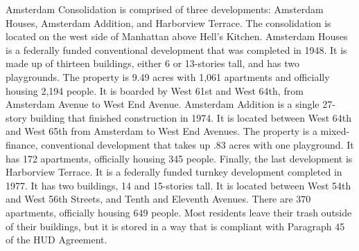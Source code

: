  

 

Amsterdam Consolidation is comprised of three developments: Amsterdam Houses, Amsterdam Addition, and Harborview Terrace. The consolidation is located on the west side of Manhattan above Hell's Kitchen. Amsterdam Houses is a federally funded conventional development that was completed in 1948. It is made up of thirteen buildings, either 6 or 13-stories tall, and has two playgrounds. The property is 9.49 acres with 1,061 apartments and officially housing 2,194 people. It is boarded by West 61st and West 64th, from Amsterdam Avenue to West End Avenue. Amsterdam Addition is a single 27-story building that finished construction in 1974. It is located between West 64th and West 65th from Amsterdam to West End Avenues. The property is a mixed-finance, conventional development that takes up .83 acres with one playground. It has 172 apartments, officially housing 345 people. Finally, the last development is Harborview Terrace. It is a federally funded turnkey development completed in 1977. It has two buildings, 14 and 15-stories tall. It is located between West 54th and West 56th Streets, and Tenth and Eleventh Avenues. There are 370 apartments, officially housing 649 people. Most residents leave their trash outside of their buildings, but it is stored in a way that is compliant with Paragraph 45 of the HUD Agreement.
